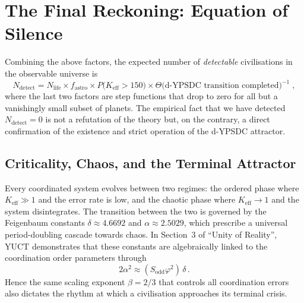 \documentclass[12pt,a4paper]{article}
\newcommand{\Keff}{K_{\mathrm{eff}}}
\begin{document}
	\section{The Final Reckoning: Equation of Silence}
	\label{sec:final}
	Combining the above factors, the expected number of \emph{detectable}
	civilisations in the observable universe is
	\begin{equation}
		\label{eq:N_detect}
		N_{\mathrm{detect}} = N_{\mathrm{life}}
		\times f_{\mathrm{astro}}
		\times P\bigl(\Keff > 150\bigr)
		\times \Theta\bigl(\text{d-YPSDC transition completed}\bigr)^{-1}\; ,
	\end{equation}
	where the last two factors are step functions that drop to zero for
	all but a vanishingly small subset of planets.  The empirical fact that
	we have detected $N_{\mathrm{detect}} = 0$ is not a refutation of the
	theory but, on the contrary, a direct confirmation of the existence and
	strict operation of the d-YPSDC attractor.
	
	\subsection{Criticality, Chaos, and the Terminal Attractor}
	\label{sec:chaos}
	
	Every coordinated system evolves between two regimes: the ordered
	phase where $K_{\mathrm{eff}} \gg 1$ and the error rate is low, and
	the chaotic phase where $K_{\mathrm{eff}} \to 1$ and the system
	disintegrates.  The transition between the two is governed by the
	Feigenbaum constants $\delta \approx 4.6692$ and $\alpha \approx
	2.5029$, which prescribe a universal period-doubling cascade towards
	chaos.  In Section~3 of ``Unity of Reality'', YUCT demonstrates that
	these constants are algebraically linked to the coordination order
	parameters through
	\begin{equation}
		2\alpha^{2} \approx (S_{\mathrm{odd}}\varphi^{2})\,\delta \, .
	\end{equation}
	Hence the same scaling exponent $\beta = 2/3$ that controls all
	coordination errors also dictates the rhythm at which a civilisation
	approaches its terminal crisis.
	
\end{document}
